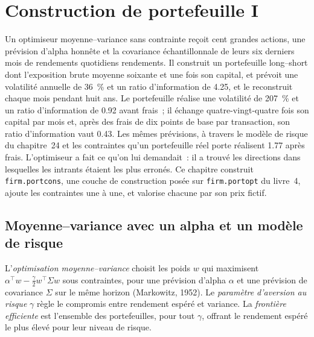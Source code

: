 \chapter{Construction de portefeuille I}\label{ch:rs:portfolio-construction-i}

Un optimiseur moyenne--variance sans contrainte reçoit cent grandes actions, une prévision d'alpha honnête et la covariance échantillonnale de leurs six derniers mois de rendements quotidiens
rendements. Il construit un portefeuille long--short dont l'exposition brute moyenne soixante et une fois son capital, et prévoit une volatilité annuelle de 36~\% et un
ratio d'information de 4.25, et le reconstruit chaque mois pendant huit ans. Le portefeuille réalise une volatilité de 207~\% et un ratio d'information de 0.92 avant
frais~; il échange quatre-vingt-quatre fois son capital par mois et, après des frais de dix points de base par transaction, son ratio d'information vaut 0.43. Les mêmes prévisions, à travers
le modèle de risque du chapitre~24 et les contraintes qu'un portefeuille réel porte réalisent 1.77 après frais. L'optimiseur a fait ce qu'on lui demandait~: il a trouvé les directions dans lesquelles
les intrants étaient les plus erronés. Ce chapitre construit \texttt{firm.portcons}, une couche de construction posée sur \texttt{firm.portopt} du livre~4, ajoute les contraintes une à une,
et valorise chacune par son prix fictif.

\section{Moyenne--variance avec un alpha et un modèle de risque}

\begin{definition}\label{def:rs:portfolio-construction-i:mv}
L'\emph{optimisation moyenne--variance} choisit les poids $w$ qui maximisent $\alpha^\top w - \frac{\gamma}{2} w^\top\Sigma w$
sous contraintes, pour une prévision d'alpha $\alpha$ et une prévision de covariance $\Sigma$ sur le même horizon (Markowitz, 1952). Le
\emph{paramètre d'aversion au risque} $\gamma$ règle le compromis entre rendement espéré et variance. La \emph{frontière
efficiente} est l'ensemble des portefeuilles, pour tout $\gamma$, offrant le rendement espéré le plus élevé pour leur niveau de risque.
\end{definition}

